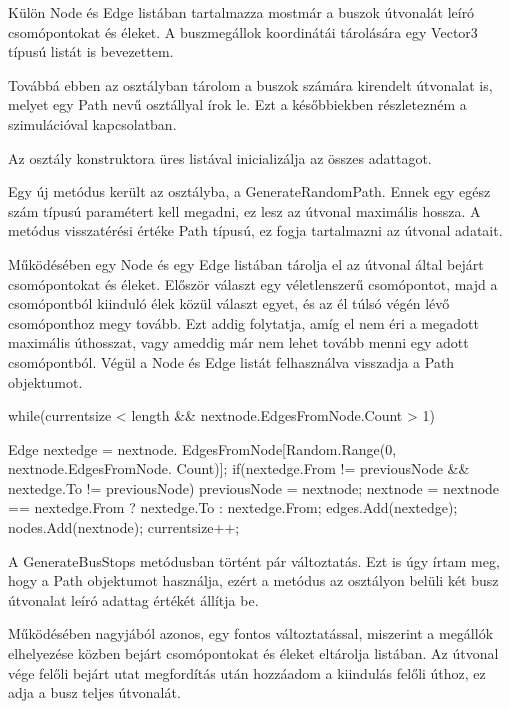 Külön Node és Edge listában tartalmazza mostmár a buszok útvonalát leíró csomópontokat és éleket. A buszmegállok koordinátái tárolására egy Vector3 típusú listát is bevezettem.

Továbbá ebben az osztályban tárolom a buszok számára kirendelt útvonalat is, melyet egy Path nevű osztállyal írok le. Ezt a későbbiekben részletezném a szimulációval kapcsolatban.

Az osztály konstruktora üres listával inicializálja az összes adattagot.

Egy új metódus került az osztályba, a GenerateRandomPath. Ennek egy egész szám típusú paramétert kell megadni, ez lesz az útvonal maximális hossza. A metódus visszatérési értéke Path típusú, ez fogja tartalmazni az útvonal adatait.

Működésében egy Node és egy Edge listában tárolja el az útvonal által bejárt csomópontokat és éleket. Először választ egy véletlenszerű csomópontot, majd a csomópontból kiinduló élek közül választ egyet, és az él túlsó végén lévő csomóponthoz megy tovább. Ezt addig folytatja, amíg el nem éri a megadott maximális úthosszat, vagy ameddig már nem lehet tovább menni egy adott csomópontból. Végül a Node és Edge listát felhasználva visszadja a Path objektumot.
\begin{cpp}
while(currentsize < length && nextnode.EdgesFromNode.Count > 1)
            {
                Edge nextedge = nextnode.
                EdgesFromNode[Random.Range(0, nextnode.EdgesFromNode.
                Count)];
                if(nextedge.From != previousNode && nextedge.To != 
                previousNode)
                {
                    previousNode = nextnode;
                    nextnode = nextnode == nextedge.From ? nextedge.To : 
                    nextedge.From;
                    edges.Add(nextedge);
                    nodes.Add(nextnode);
                    currentsize++;
                }
                
            }
\end{cpp}

A GenerateBusStops metódusban történt pár változtatás. Ezt is úgy írtam meg, hogy a Path objektumot használja, ezért a metódus az osztályon belüli két busz útvonalat leíró adattag értékét állítja be.

Működésében nagyjából azonos, egy fontos változtatással, miszerint a megállók elhelyezése közben bejárt csomópontokat és éleket eltárolja listában. Az útvonal vége felőli bejárt utat megfordítás után hozzáadom a kiindulás felőli úthoz, ez adja a busz teljes útvonalát.

